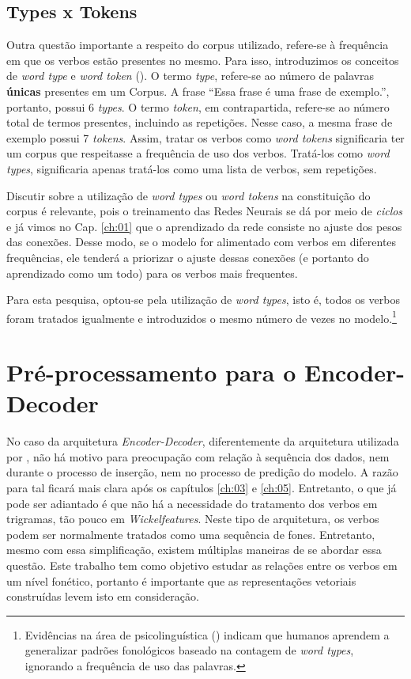 \subsection{Types x Tokens}
Outra questão importante a respeito do corpus utilizado, refere-se à frequência em que os verbos estão presentes no mesmo. Para isso, introduzimos os conceitos de \textit{word type} e \textit{word token} (\cite{peirce:1906}). O termo \textit{type}, refere-se ao número de palavras \textbf{únicas} presentes em um Corpus. A frase “Essa frase é uma frase de exemplo.”, portanto, possui 6 \textit{types}. O termo \textit{token}, em contrapartida, refere-se ao número total de termos presentes, incluindo as repetições. Nesse caso, a mesma frase de exemplo possui 7 \textit{tokens}. Assim, tratar os verbos como \textit{word tokens} significaria ter um corpus que respeitasse a frequência de uso dos verbos. Tratá-los como \textit{word types}, significaria apenas tratá-los como uma lista de verbos, sem repetições. 

Discutir sobre a utilização de \textit{word types} ou \textit{word tokens} na constituição do corpus é relevante, pois o treinamento das Redes Neurais se dá por meio de \textit{ciclos} e já vimos no Cap. \ref{ch:01} que o aprendizado da rede consiste no ajuste dos pesos das conexões. Desse modo, se o modelo for alimentado com verbos em diferentes frequências, ele tenderá a priorizar o ajuste dessas conexões (e portanto do aprendizado como um todo) para os verbos mais frequentes. 

Para esta pesquisa, optou-se pela utilização de \textit{word types}, isto é, todos os verbos foram tratados igualmente e introduzidos o mesmo número de vezes no modelo.\footnote{Evidências na área de psicolinguística (\cite{Bybee:1995,janet:2018}) indicam que humanos aprendem a generalizar padrões fonológicos baseado na contagem de \textit{word types}, ignorando a frequência de uso das palavras.} 

\section{Pré-processamento para o Encoder-Decoder}

No caso da arquitetura \textit{Encoder-Decoder}, diferentemente da arquitetura utilizada por \cite{rumelhart:1986}, não há motivo para preocupação com relação à sequência dos dados, nem durante o processo de inserção, nem no processo de predição do modelo. A razão para tal ficará mais clara após os capítulos \ref{ch:03} e \ref{ch:05}. Entretanto, o que já pode ser adiantado é que não há a necessidade do tratamento dos verbos em trigramas, tão pouco em \textit{Wickelfeatures}. Neste tipo de arquitetura, os verbos podem ser normalmente tratados como uma sequência de fones. Entretanto, mesmo com essa simplificação, existem múltiplas maneiras de se abordar essa questão. Este trabalho tem como objetivo estudar as relações entre os verbos em um nível fonético, portanto é importante que as representações vetoriais construídas levem isto em consideração.

